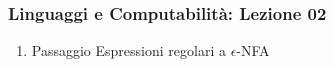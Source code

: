 




\begin{frame}[fragile]
	\frametitle{Linguaggi e Computabilità: Lezione 02}
\begin{enumerate}
\item
Passaggio Espressioni regolari a $\epsilon$-NFA
\end{enumerate}
\end{frame}



